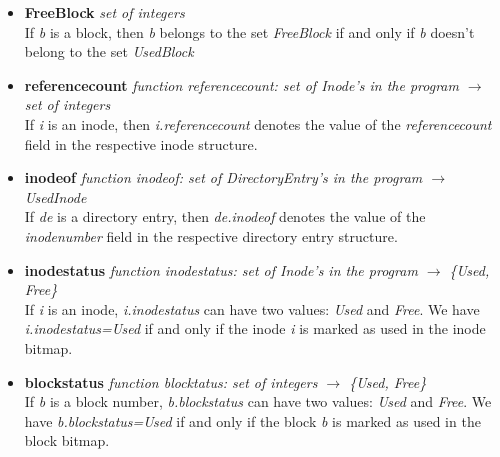 \documentclass{article}
\begin{document}
\begin{flushleft}
\begin{itemize}
  \item{{\bf FreeBlock} {\it set of integers}
  \\If {\it b} is a block, then {\it b} belongs to the set {\it FreeBlock} if 
and only if {\it b} doesn't belong to the set {\it UsedBlock}}


  \item{{\bf referencecount} {\it function referencecount: set of Inode's in the program  $\rightarrow$  set of integers}
  \\ If {\it i} is an inode, then {\it i.referencecount} denotes the value of 
the {\it referencecount} field in the respective inode structure.}

  \item{{\bf inodeof} {\it function inodeof: set of DirectoryEntry's in the 
program  $\rightarrow$  UsedInode}
  \\ If {\it de} is a directory entry, then {\it de.inodeof} denotes the value 
  of the {\it inodenumber} field in the respective directory entry structure.}

  \item{{\bf inodestatus} {\it function inodestatus: set of Inode's in the 
program  $\rightarrow$  \{Used, Free\}}
  \\ If {\it i} is an inode, {\it i.inodestatus} can have two values: 
  {\it Used} and {\it Free}.  We have {\it i.inodestatus=Used} if and only if 
  the inode {\it i} is marked as used in the inode bitmap.}

  \item{{\bf blockstatus} {\it function blocktatus: set of integers  
$\rightarrow$  \{Used, Free\}}
  \\ If {\it b} is a block number, {\it b.blockstatus} can have two values: 
  {\it Used} and {\it Free}. We have {\it b.blockstatus=Used} if and only if 
  the block {\it b} is marked as used in the block bitmap.}


\end{itemize}


\end{flushleft}
\end{document}
